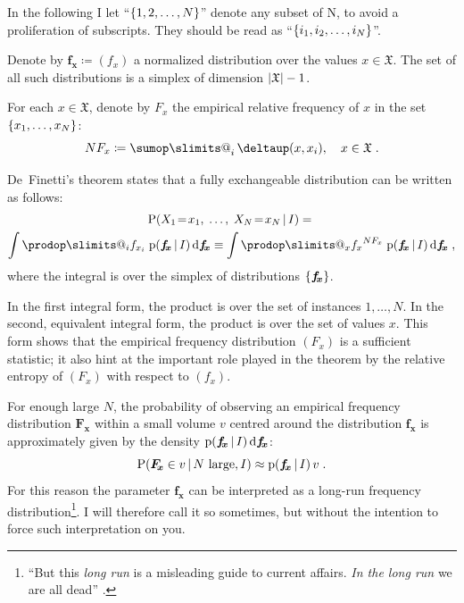 \documentclass[\ifafour a4paper,12pt,\else a5paper,10pt,\fi%
onecolumn,oneside,article,%
british%
]{memoir}
\makeatletter
\theoremstyle{remark}
\theoremstyle{innote}
\def\sum{\DOTSI\sumop\slimits@}
\def\prod{\DOTSI\prodop\slimits@}
\newcommand*{\delt}{\deltaup}%
\newcommand*{\di}{\mathrm{d}}%
\newcommand*{\NN}{\bm{\mathrm{N}}}
\newcommand*{\defd}{\coloneqq}
\DeclarePairedDelimiter\abs{\lvert}{\rvert}
\DeclarePairedDelimiter\set{\{}{\}}
\newcommand*{\pf}{\mathrm{p}}%
\newcommand*{\p}{\mathrm{P}}%
\renewcommand*{\|}[1][]{\nonscript\,#1\vert\nonscript\,\mathopen{}}
\newcommand*{\sect}{\S}%
\newcommand*{\tsum}{\mathop{\textstyle\sum}\nolimits}
\renewcommand*{\=}{\TextOrMath\texteq\eq}
\newcommand*{\X}[1]{X_{#1}}
\newcommand*{\x}[1]{x_{#1}}
\newcommand*{\sX}{\mathfrak{X}}
\newcommand*{\vf}{v}
\newcommand*{\fx}{\bm{f_{\!x}}}
\newcommand*{\Fx}{\bm{F_{\!x}}}
\makeatother
\begin{document}
In the following I let \enquote{$\set{1, 2, \dotsc, N}$} denote any subset
of $\NN$, to avoid a proliferation of subscripts. They should be read as
\enquote{$\set{i_{1}, i_{2}, \dotsc, i_{N}}$}.

Denote by $\fx \defd (f_{x})$ a normalized distribution over the values
$x \in \sX$. The set of all such distributions is a simplex of dimension
$\abs{\sX}-1$.

For each $x \in \sX$, denote by $F_{x}$ the empirical relative frequency of
$x$ in the set $\set{x_{1}, \dotsc, x_{N}}$:
\begin{equation}
  \label{eq:rel_frequencies}
  N F_{x} \defd \tsum_{i}\delt(x, \x{i}), \quad x \in \sX \;.
\end{equation}

De~Finetti's theorem states that a fully exchangeable distribution can be
written as follows:
\begin{multline}
  \label{eq:definetti_freq}
  \p( \X{1}\=\x{1},\; \dotsc, \; \X{N}\=\x{N} \| I) ={}\\
  \int \prod_{i} f_{\x{i}}\;  \pf(\fx \| I)\,\di\fx
\equiv  \int\prod_{x} {f_{x}}^{N F_{x}}\;   \pf(\fx \| I)\,\di\fx \;,
\end{multline}
where the integral is over the simplex of distributions $\set{\fx}$.

In the first integral form, the product is over the set of instances
$1,\dotsc,N$. In the second, equivalent integral form, the product is over
the set of values $x$. This form shows that the empirical frequency
distribution $(F_{x})$ is a sufficient statistic; it also hint at the
important role played in the theorem by the relative entropy of $(F_{x})$
with respect to $(f_{x})$.

For enough large $N$, the probability of observing an empirical frequency
distribution $\Fx$ within a small volume $\vf$ centred around the
distribution $\fx$ is approximately given by the density
$\pf(\fx \| I)\,\di\fx$:
\begin{equation}
  \label{eq:longrun_freq}
  \p( \Fx \in v \| \text{$N$ large}, I)
  \approx \pf(\fx \| I)\,v \;.
\end{equation}
For this reason the parameter $\fx$ can be interpreted as a long-run
frequency distribution\footnote{\enquote{But this \emph{long run} is a
    misleading guide to current affairs. \emph{In the long run} we are all
    dead} \parencite[\sect~3.I p.~65]{keynes1923_r2013}.}. I will therefore call it so sometimes, but without
the intention to force such interpretation on you.
\end{document}
